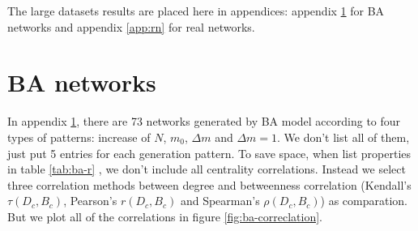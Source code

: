 \documentclass[symmetry,article,submit,moreauthors,pdftex,10pt,a4paper]{Definitions/mdpi}
\begin{document}
%
\newpage

\appendix

The large datasets results are placed here in appendices: appendix \ref{app:ba} for BA networks and appendix \ref{app:rn} for real networks.

\section{BA networks}
\label{app:ba}
\setcounter{table}{0}
\renewcommand{\thetable}{A\arabic{table}}
\setcounter{figure}{0}
\renewcommand{\thefigure}{A\arabic{figure}}
In appendix \ref{app:ba}, there are 73 networks generated by BA model according to four types of patterns: increase of $N$, $m_0$, $\Delta m$ and $\Delta m=1$. We don't list all of them, just put 5 entries for each generation pattern. To save space, when list properties in table \ref{tab:ba-r} , we don't include all centrality correlations. Instead we select three correlation methods between degree and betweenness correlation (Kendall's $\tau(D_c,B_c)$, Pearson's $r(D_c,B_c)$ and Spearman's $\rho(D_c,B_c)$) as comparation. But we plot all of the correlations in figure \ref{fig:ba-correclation}.
\end{document}
